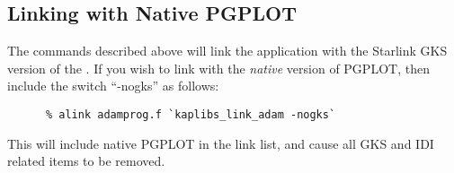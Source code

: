 \subsection{Linking with Native PGPLOT}
The commands described above will link the application with the Starlink
GKS version of the . If you wish
to link with the {\em native} version of PGPLOT, then include the switch
``-nogks'' as follows:

\small
\begin{verbatim}
      % alink adamprog.f `kaplibs_link_adam -nogks`
\end{verbatim}
\normalsize

This will include native PGPLOT in the link list, and cause all GKS and IDI
related items to be removed.

\newpage
\appendix

